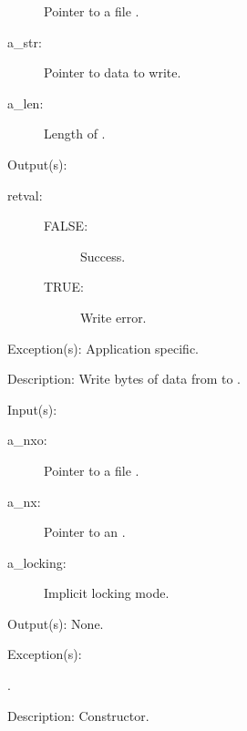 \begin{capi}
\begin{capilist}
\begin{description}
			Pointer to a file .
		\item[a\_str: ]
			Pointer to data to write.
		\item[a\_len: ]
			Length of .
		\end{description}
	\item[Output(s): ]
		\begin{description}\item[]
		\item[retval: ]
			\begin{description}\item[]
			\item[FALSE: ]
				Success.
			\item[TRUE: ]
				Write error.
			\end{description}
		\end{description}
	\item[Exception(s): ] Application specific.
	\item[Description: ]
		Write  bytes of data from  to
		.
	\end{capilist}
\label{nxo_file_new}
	\begin{capilist}
	\item[Input(s): ]
		\begin{description}\item[]
		\item[a\_nxo: ]
			Pointer to a file .
		\item[a\_nx: ]
			Pointer to an .
		\item[a\_locking: ]
			Implicit locking mode.
		\end{description}
	\item[Output(s): ] None.
	\item[Exception(s): ]
		\begin{description}\item[]
		\item[.]
		\end{description}
	\item[Description: ]
		Constructor.
	\end{capilist}
\label{nxo_file_fd_wrap}
	\begin{capilist}

\end{capilist}
\end{capi}
